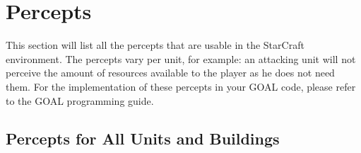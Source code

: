 \chapter{Percepts}

This section will list all the percepts that are usable in the StarCraft environment. The percepts vary per unit, for example: an attacking unit will not perceive the amount of resources available to the player as he does not need them. For the implementation of these percepts in your GOAL code, please refer to the GOAL programming guide.

\newpage
\section{Percepts for All Units	and Buildings}

